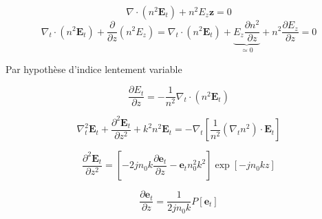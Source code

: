 \documentclass[a4paper,11pt]{report}
\begin{document}
\[\nabla\cdot(n^2\mathbf{E}_t)+n^2E_z\mathbf{z}=0\]
\[\nabla_t \cdot(n^2\mathbf{E}_t)+\dfrac{\partial}{\partial z}(n^2E_z)=\nabla_t\cdot(n^2\mathbf{E}_t)+\underbrace{E_z\dfrac{\partial n^2}{\partial z}}_{\simeq 0} +n^2\dfrac{\partial E_z}{\partial z}=0\]

Par hypothèse d'indice lentement variable

\[\dfrac{\partial E_t}{\partial z}=-\dfrac{1}{n^2}\nabla_t\cdot(n^2\mathbf{E}_t)\]

%
%
\[\nabla^2_t\mathbf{E}_t+\dfrac{\partial^2 \mathbf{E}_t}{\partial z^2}+k^2n^2\mathbf{E}_t=-\nabla_t\left[\dfrac{1}{n^2}(\nabla_tn^2)\cdot\mathbf{E}_t\right]\]

\[\dfrac{\partial^2 \mathbf{E}_t}{\partial z^2}=\left[-2jn_0k\dfrac{\partial \mathbf{e}_t}{\partial z}-\mathbf{e}_tn_0^2k^2\right]\exp\left[-jn_0kz\right]\]



\[\dfrac{\partial \mathbf{e}_t}{\partial z}=\dfrac{1}{2jn_0k}P\left[\mathbf{e}_t\right]\]
\end{document}
